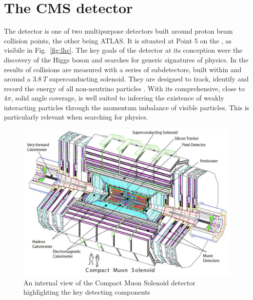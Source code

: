 \section{The CMS detector} \label{sec:cms}

The \CMS detector is one of two multipurpose detectors built around
proton beam collision points, the other being ATLAS. It is situated at
Point 5 on the \LHC, as visibile in Fig.~\ref{fig:lhc}. The key goals
of the \CMS detector at its conception were the discovery of the \SM
Higgs boson and searches for generic signatures of \BSM physics. In \CMS the
results of collisions are measured with a series of subdetectors,
built within and around a $3.8~T$ superconducting solenoid. They are designed to
track, identify and record the energy of all non-neutrino \SM particles
\cite{Bayatian:2006zz}. With its comprehensive, close to $4\pi$, solid
angle coverage, \CMS is well suited to inferring the existence of
weakly interacting particles through the momentum imbalance of visible
particles. This is particularly relevant when searching for \BSM
physics.

\begin{figure}
\begin{center}
\includegraphics[width=0.8\linewidth]{figs/cms_detector} \end{center}
\caption{An internal view of the Compact Muon Solenoid detector
highlighting the key detecting components \cite{Bayatian:2006zz}}
\label{fig:CMS} \end{figure}

